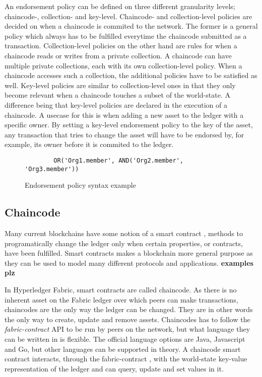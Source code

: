 \documentclass[english, biblatex, digitaloutput]{kththesis}
\begin{document}
An endorsement policy can be defined on three different granularity levels; chaincode-, collection- and key-level. Chaincode- and collection-level policies are decided on when a chaincode is commited to the network. The former is a general policy which always has to be fulfilled everytime the chaincode submitted as a transaction. Collection-level policies on the other hand are rules for when a chaincode reads or writes from a private collection. A chaincode can have multiple private collections, each with its own collection-level policy. When a chaincode accesses such a collection, the additional policies have to be satisfied as well. Key-level policies are similar to collection-level ones in that they only become relevant when a chaincode touches a subset of the world-state. A difference being that key-level policies are declared in the execution of a chaincode. A usecase for this is when adding a new asset to the ledger with a specific owner. By setting a key-level endorsement policy to the key of the asset, any transaction that tries to change the asset will have to be endorsed by, for example, its owner before it is commited to the ledger.

\begin{figure}
	\begin{verbatim}
		OR('Org1.member', AND('Org2.member', 'Org3.member'))
	\end{verbatim}
	\caption{Endorsement policy syntax example}
	\label{fig:endorsement-policy-example}
\end{figure}

\subsection{Chaincode}

Many current blockchains have some notion of a smart contract \cite{di_pierro_what_2017}, \ie methods to programatically change the ledger only when certain properties, or contracts, have been fulfilled. Smart contracts makes a blockchain more general purpose as they can be used to model many different protocols and applications. \textbf{examples plz}

In Hyperledger Fabric, smart contracts are called chaincode. As there is no inherent asset on the Fabric ledger over which peers can make transactions, chaincodes are the only way the ledger can be changed. They are in other words the only way to create, update and remove assets. Chaincodes has to follow the \textit{fabric-contract} \gls{API} to be run by peers on the network, but what language they can be written in is flexible. The official language options are Java, Javascript and Go, but other languages can be supported in theory. A chaincode smart contract interacts, through the fabric-contract , with the world-state key-value representation of the ledger and can query, update and set values in it.
\end{document}
